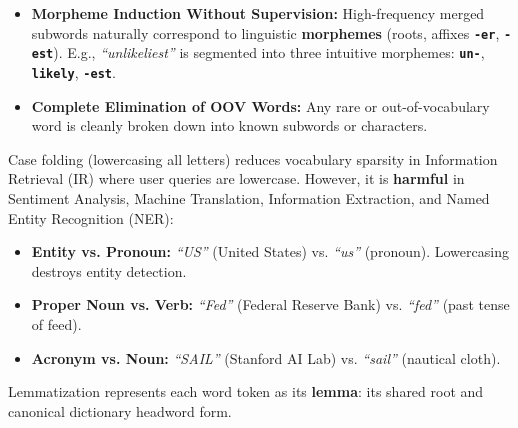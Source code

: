 \documentclass[10pt,a4paper]{article}
\newcommand{\rx}[1]{\texttt{\bfseries\color{inlinecode}#1}}
\begin{document}
\vspace{-2pt}
\par\vspace{1pt}
\begin{itemize}[leftmargin=12pt, itemsep=0.5pt, parsep=0pt, topsep=0.5pt]
    \item \textbf{Morpheme Induction Without Supervision:} High-frequency merged subwords naturally correspond to linguistic \textbf{morphemes} (roots, affixes \rx{-er}, \rx{-est}). E.g., \textit{``unlikeliest''} is segmented into three intuitive morphemes: \rx{un-}, \rx{likely}, \rx{-est}.
    \item \textbf{Complete Elimination of OOV Words:} Any rare or out-of-vocabulary word is cleanly broken down into known subwords or characters.
\end{itemize}

\vspace{-2pt}
\par\vspace{1pt}
Case folding (lowercasing all letters) reduces vocabulary sparsity in Information Retrieval (IR) where user queries are lowercase. However, it is \textbf{harmful} in Sentiment Analysis, Machine Translation, Information Extraction, and Named Entity Recognition (NER):
\begin{itemize}[leftmargin=12pt, itemsep=0.5pt, parsep=0pt, topsep=0.5pt]
    \item \textbf{Entity vs. Pronoun:} \textit{``US''} (United States) vs. \textit{``us''} (pronoun). Lowercasing destroys entity detection.
    \item \textbf{Proper Noun vs. Verb:} \textit{``Fed''} (Federal Reserve Bank) vs. \textit{``fed''} (past tense of feed).
    \item \textbf{Acronym vs. Noun:} \textit{``SAIL''} (Stanford AI Lab) vs. \textit{``sail''} (nautical cloth).
\end{itemize}

\newpage


\par\vspace{1pt}
Lemmatization represents each word token as its \textbf{lemma}: its shared root and canonical dictionary headword form.
\end{document}
